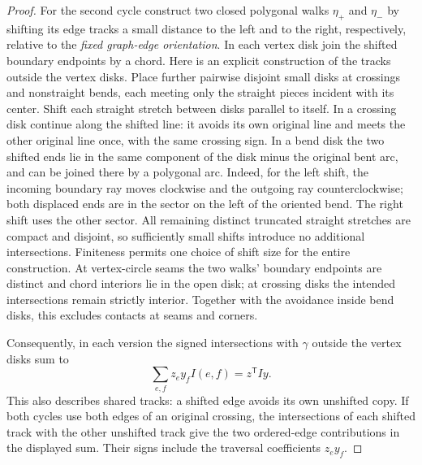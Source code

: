 \begin{proof}
For the second cycle construct two closed polygonal walks
$\eta_+$ and $\eta_-$ by shifting its edge tracks a small distance to
the left and to the right, respectively, relative to the \emph{fixed
graph-edge orientation}.  In each vertex disk join the shifted
boundary endpoints by a chord.  Here is an explicit construction of
the tracks outside the vertex disks.  Place further pairwise disjoint
small disks at crossings and nonstraight bends, each meeting only the
straight pieces incident with its center.  Shift each straight stretch
between disks parallel to itself.  In a crossing disk continue along
the shifted line: it avoids its own original line and meets the other
original line once, with the same crossing sign.  In a bend disk the
two shifted ends lie in the same component of the disk minus the
original bent arc, and can be joined there by a polygonal arc.  Indeed,
for the left shift, the incoming boundary ray moves clockwise and the
outgoing ray counterclockwise; both displaced ends are in the sector
on the left of the oriented bend.  The right shift uses the other
sector.  All remaining distinct truncated straight stretches are
compact and disjoint, so sufficiently small shifts introduce no
additional intersections.  Finiteness permits one choice of shift
size for the entire construction. At vertex-circle seams the two walks'
boundary endpoints are distinct and chord interiors lie in the open disk;
at crossing disks the intended intersections remain strictly interior.
Together with the avoidance inside bend disks, this excludes contacts
at seams and corners.

Consequently, in each version the signed intersections with $\gamma$
outside the vertex disks sum to
\begin{equation}
 \label{eq:exterior-intersections}
 \sum_{e,f}z_e y_f I(e,f)=z^{\mathsf T}Iy.
\end{equation}
This also describes shared tracks: a shifted edge avoids its own
unshifted copy.  If both cycles use both edges of an original crossing,
the intersections of each shifted track with the other unshifted track
give the two ordered-edge contributions in the displayed sum.  Their
signs include the traversal coefficients $z_e y_f$.


\end{proof}
